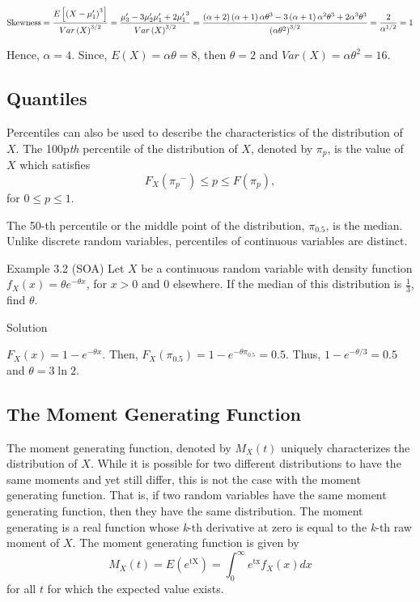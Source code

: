 \documentclass[]{book}
\theoremstyle{definition}
\theoremstyle{definition}
\theoremstyle{definition}
\theoremstyle{remark}
\begin{document}
\[\text{Skewness}  = \frac{E\left\lbrack {(X - \mu_{1}^{\prime})}^{3} \right\rbrack}{{Var\left( X \right)}^{3/2}} = \frac{\mu_{3}^{\prime} - 3\mu_{2}^{\prime}\mu_{1}^{\prime} + 2{\mu_{1}^{\prime}}^{3}}{{Var\left( X \right)}^{3/2}} \\
 = \frac{\left( \alpha + 2 \right)\left( \alpha + 1 \right)\alpha\theta^{3} - 3\left( \alpha + 1 \right)\alpha^{2}\theta^{3} + 2\alpha^{3}\theta^{3}}{\left( \alpha\theta^{2} \right)^{3/2}} = \frac{2}{\alpha^{1/2}} = 1\]

Hence, \(\alpha = 4\). Since, \(E\left( X \right) = \alpha\theta = 8\),
then \(\theta = 2\) and \(Var\left( X \right) = \alpha\theta^{2} = 16\).

\subsection{Quantiles}\label{quantiles}

Percentiles can also be used to describe the characteristics of the
distribution of \(X\). The 100p\emph{th} percentile of the distribution
of \(X\), denoted by \(\pi_{p}\), is the value of \(X\) which satisfies
\[F_{X}\left( {\pi_{p}}^{-} \right) \leq p \leq F\left( \pi_{p} \right) ,\]
for \(0 \leq p \leq 1\).

The 50-th percentile or the middle point of the distribution,
\(\pi_{0.5}\), is the median. Unlike discrete random variables,
percentiles of continuous variables are distinct.

Example 3.2 (SOA) Let \(X\) be a continuous random variable with density
function \(f_{X}\left( x \right) = \theta e^{- \theta x}\), for
\(x > 0\) and 0 elsewhere. If the median of this distribution is
\(\frac{1}{3}\), find \(\theta\).

Solution

\(F_{X}\left( x \right) = 1 - e^{- \theta x}\). Then,
\(F_{X}\left( \pi_{0.5} \right) = 1 - e^{- \theta\pi_{0.5}} = 0.5\).
Thus, \(1 - e^{-\theta / 3} = 0.5\) and \(\theta = 3 \ln 2\).

\subsection{The Moment Generating
Function}\label{the-moment-generating-function}

The moment generating function, denoted by \(M_{X}\left( t \right)\)
uniquely characterizes the distribution of \(X\). While it is possible
for two different distributions to have the same moments and yet still
differ, this is not the case with the moment generating function. That
is, if two random variables have the same moment generating function,
then they have the same distribution. The moment generating is a real
function whose \emph{k}-th derivative at zero is equal to the
\emph{k}-th raw moment of \(X\). The moment generating function is given
by
\[M_{X}\left( t \right) = E\left( e^{\text{tX}} \right) = \int_{0}^{\infty}{e^{\text{tx}}f_{X}\left( x \right) dx }\]
for all \(t\) for which the expected value exists.
\end{document}
